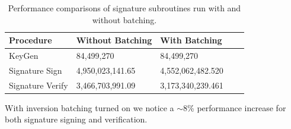 \begin{table}
\begin{center}
\begin{tabular}{@{}lllll@{}}
	\toprule
	Procedure & Without Batching & With Batching\\
	\midrule
	KeyGen & 84,499,270 & 84,499,270\\
	Signature Sign & 4,950,023,141.65 & 4,552,062,482.520\\
	Signature Verify & 3,466,703,991.09 & 3,173,340,239.461\\
	\bottomrule
\end{tabular}
\end{center}
\caption{Performance comparisons of signature subroutines run with and without batching.}
\label{fig:batchgains}
\end{table}

With inversion batching turned on we notice a ${\sim}8$\% performance increase for both signature signing and verification.\\

